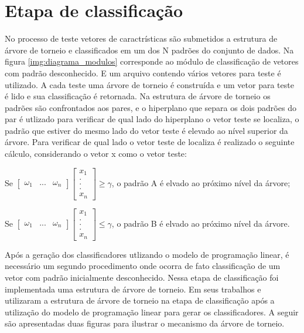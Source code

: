 \section{Etapa de classificação}
No processo de teste vetores de caractrísticas são submetidos a estrutura de árvore de torneio e classificados em um dos N padrões do conjunto de dados.
Na figura \ref{img:diagrama_modulos} corresponde ao módulo de classificação de vetores com padrão desconhecido. E um arquivo contendo vários vetores para teste é utilizado.  A cada teste uma árvore de torneio é construída e um vetor para teste é lido e sua classificação é retornada. Na estrutura de árvore de torneio os padrões são confrontados aos pares, e o hiperplano que separa os dois padrões do par é utlizado para verificar de qual lado do hiperplano o vetor teste se localiza, o padrão que estiver do mesmo lado do vetor teste é elevado ao nível superior da árvore. Para verificar de qual lado o vetor teste de localiza é realizado o seguinte cálculo, considerando o vetor x como o vetor teste:

Se $ \begin{bmatrix}
\omega _{1} & ... & \omega _{n} 
\end{bmatrix}
\begin{bmatrix}
x_{1}
\\ 
.
\\
. 
\\
. 
\\
x_{n}
\end{bmatrix}
\geq \gamma $, o padrão A é elvado ao próximo nível da árvore;

Se $ \begin{bmatrix}
\omega _{1} & ... & \omega _{n} 
\end{bmatrix}
\begin{bmatrix}
x_{1}
\\ 
.
\\
. 
\\
. 
\\
x_{n}
\end{bmatrix}
\leq  \gamma $, o padrão B é elvado ao próximo nível da árvore.

Após a geração dos classificadores utlizando o modelo de programação linear, é necessário um segundo procedimento onde ocorra de fato classificação de um vetor com padrão inicialmente desconhecido. Nessa etapa de classificação foi implementada uma estrutura de árvore de torneio.
Em seus trabalhos  e  utilizaram a estrutura de árvore de torneio na etapa de classificação após a utilização do modelo de programação linear para gerar os classificadores.
A seguir são apresentadas duas figuras para ilustrar o mecanismo da árvore de torneio.

